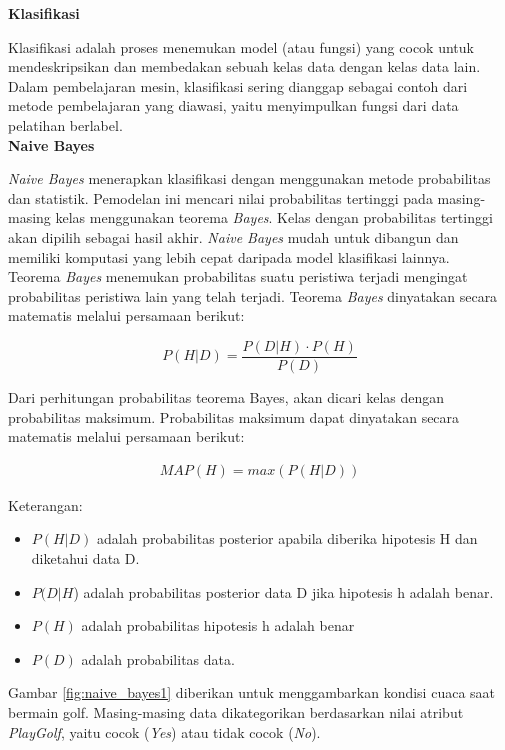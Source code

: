 \documentclass[a4paper,twoside]{article}
\begin{document}
\begin{enumerate}
\textbf{Klasifikasi}
			
Klasifikasi adalah proses menemukan model (atau fungsi) yang cocok untuk mendeskripsikan dan membedakan sebuah kelas data dengan kelas data lain. Dalam pembelajaran mesin, klasifikasi sering dianggap sebagai contoh dari metode pembelajaran yang diawasi, yaitu menyimpulkan fungsi dari data pelatihan berlabel.\\


\textbf{Naive Bayes}
\par \textit{Naive Bayes} menerapkan klasifikasi dengan menggunakan metode probabilitas dan statistik. Pemodelan ini mencari nilai probabilitas tertinggi pada masing-masing kelas menggunakan teorema \textit{Bayes}. Kelas dengan probabilitas tertinggi akan dipilih sebagai hasil akhir. \textit{Naive Bayes} mudah untuk dibangun dan memiliki komputasi yang lebih cepat daripada model klasifikasi lainnya.\\

\noindent Teorema \textit{Bayes} menemukan probabilitas suatu peristiwa terjadi mengingat probabilitas peristiwa lain yang telah terjadi. Teorema \textit{Bayes} dinyatakan secara matematis melalui persamaan berikut:

\begin{equation}
P(H|D) = \frac{P(D|H) \cdot P(H)}{P(D)}
\end{equation}

\noindent
Dari perhitungan probabilitas teorema Bayes, akan dicari kelas dengan probabilitas maksimum. Probabilitas maksimum dapat dinyatakan secara matematis melalui persamaan berikut:

\begin{align}
MAP(H) = max(P(H|D))
\end{align}

\noindent Keterangan:
\begin{itemize}
\item $P(H|D)$ adalah probabilitas posterior apabila diberika hipotesis H dan diketahui data D. 
\item $P(D|H$) adalah probabilitas posterior data D jika hipotesis h adalah benar.
\item $P(H)$ adalah probabilitas hipotesis h adalah benar 
\item $P(D)$ adalah probabilitas data.
\end{itemize}

\vspace{0.3cm}

\noindent Gambar \ref{fig:naive_bayes1} diberikan untuk menggambarkan kondisi cuaca saat bermain golf. Masing-masing data dikategorikan berdasarkan nilai atribut \textit{PlayGolf}, yaitu cocok (\textit{Yes}) atau tidak cocok (\textit{No}). 


\end{enumerate}
\end{document}
